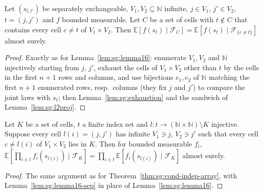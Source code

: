 \begin{lemma}\label{lem:sg:lemma16-sep}
  \leanok
Let $(s_{l,l'})$ be separately exchangeable, $V_1,V_2\subseteq\mathbb N$ infinite, $j\in V_1$, $j'\in V_2$, $t=(j,j')$ and $f$ bounded measurable. Let $C$ be a set of cells with $t\notin C$ that contains every cell $c\ne t$ of $V_1\times V_2$. Then $\mathbb E[f(s_t)\mid\mathscr F_C]=\mathbb E[f(s_t)\mid\mathscr F_{\{c\ne t\}}]$ almost surely.
\end{lemma}

\begin{proof}
  \leanok
{}
Exactly as for Lemma~\ref{lem:sg:lemma16}: enumerate $V_1,V_2$ and $\mathbb N$ injectively starting from $j$, $j'$, exhaust the cells of $V_1\times V_2$ other than $t$ by the cells in the first $n+1$ rows and columns, and use bijections $e_1,e_2$ of $\mathbb N$ matching the first $n+1$ enumerated rows, resp.\ columns (they fix $j$ and $j'$) to compare the joint laws with $s_t$; then Lemma~\ref{lem:sg:exhaustion} and the sandwich of Lemma~\ref{lem:sg:l2proj}.
\end{proof}

\begin{theorem}\label{thm:sg:cond-indep-array-sep}
  \leanok
Let $K$ be a set of cells, $t$ a finite index set and $l:t\to(\mathbb N\times\mathbb N)\setminus K$ injective. Suppose every cell $l(i)=(j,j')$ has infinite $V_1\ni j$, $V_2\ni j'$ such that every cell $c\ne l(i)$ of $V_1\times V_2$ lies in $K$. Then for bounded measurable $f_i$, $\mathbb E[\prod_{i\in t}f_i(s_{l(i)})\mid\mathscr F_K]=\prod_{i\in t}\mathbb E[f_i(s_{l(i)})\mid\mathscr F_K]$ almost surely.
\end{theorem}

\begin{proof}
  \leanok
{}
The same argument as for Theorem~\ref{thm:sg:cond-indep-array}, with Lemma~\ref{lem:sg:lemma16-sep} in place of Lemma~\ref{lem:sg:lemma16}.
\end{proof}

